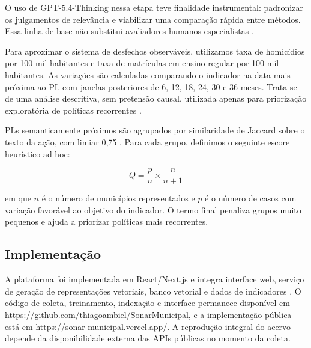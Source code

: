 O uso de GPT-5.4-Thinking nessa etapa teve finalidade instrumental: padronizar os julgamentos de relevância e viabilizar uma comparação rápida entre métodos. Essa linha de base não substitui avaliadores humanos especialistas \cite{soboroff_2025}.

Para aproximar o sistema de desfechos observáveis, utilizamos taxa de homicídios por 100 mil habitantes e taxa de matrículas em ensino regular por 100 mil habitantes. As variações são calculadas comparando o indicador na data mais próxima ao PL com janelas posteriores de 6, 12, 18, 24, 30 e 36 meses. Trata-se de uma análise descritiva, sem pretensão causal, utilizada apenas para priorização exploratória de políticas recorrentes \cite{pinto_etal_2022}.

PLs semanticamente próximos são agrupados por similaridade de Jaccard sobre o texto da ação, com limiar 0,75 \cite{jaccard_1901}. Para cada grupo, definimos o seguinte escore heurístico ad hoc:

\[
Q = \frac{p}{n} \times \frac{n}{n+1}
\]

em que $n$ é o número de municípios representados e $p$ é o número de casos com variação favorável ao objetivo do indicador. O termo final penaliza grupos muito pequenos e ajuda a priorizar políticas mais recorrentes.

\subsection{Implementação}

A plataforma foi implementada em React/Next.js e integra interface web, serviço de geração de representações vetoriais, banco vetorial e dados de indicadores \cite{vercel_nextjs}. O código de coleta, treinamento, indexação e interface permanece disponível em \url{https://github.com/thiagoambiel/SonarMunicipal}, e a implementação pública está em \url{https://sonar-municipal.vercel.app/}. A reprodução integral do acervo depende da disponibilidade externa das APIs públicas no momento da coleta.
